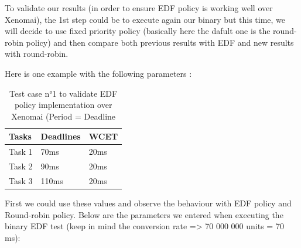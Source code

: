 \documentclass[12pt,hidelinks]{article}
\begin{document}
{\begin{enumerate}
    \end{enumerate}
        
        To validate our results (in order to ensure EDF policy is working well over Xenomai), the 1st step could be to execute again our binary but this time, we will decide to use fixed priority policy (basically here the dafult one is the round-robin policy) and then compare both previous results with EDF and new results with round-robin.\newline
        
        Here is one example with the following parameters :
        \begin{table}[ht]
        \centering
        \begin{tabular}{|l|l|l|}
        \hline
        Tasks&Deadlines&WCET\\\hline
        Task 1&70ms&20ms\\\hline
        Task 2&90ms&20ms\\\hline
        Task 3&110ms&20ms\\\hline
        \end{tabular} 
        \caption{Test case n°1 to validate EDF policy implementation over Xenomai (Period = Deadline}
        \label{tab1}
        \end{table}

        First we could use these values and observe the behaviour with EDF policy and Round-robin policy. Below are the parameters we entered when executing the binary EDF test (keep in mind the conversion rate => 70 000 000 units = 70 ms):
        
}
\end{document}
